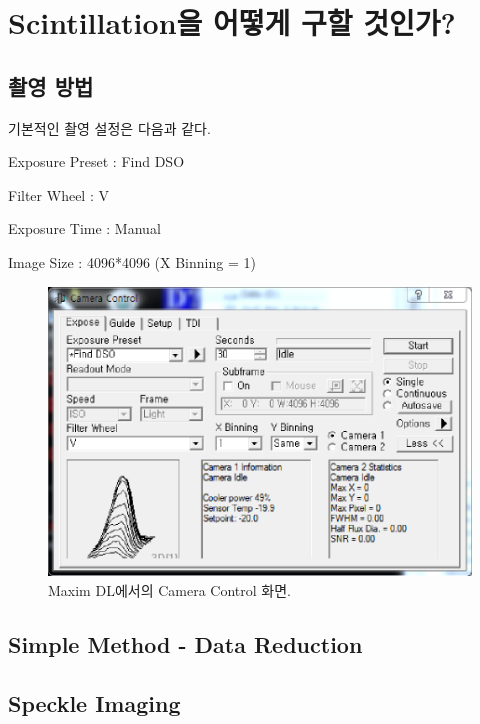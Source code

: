 \documentclass[11pt]{article}
\begin{document}
	\section{Scintillation을 어떻게 구할 것인가?}
	
	\subsection{촬영 방법}
	기본적인 촬영 설정은 다음과 같다.
	\begin{flushleft}
		Exposure Preset : Find DSO 
		
		Filter Wheel : V
		
		Exposure Time : Manual
		
		Image Size : 4096*4096 (X Binning = 1)
		
		\begin{figure}[h]
			\begin{center}
				\includegraphics[scale=0.3]{camera_control_example.png}
				\caption{Maxim DL에서의 Camera Control 화면.}
				\label{camera_control}
			\end{center}
		\end{figure}
		
	\end{flushleft}
	
	\subsection{Simple Method - Data Reduction}
	
	\subsection{Speckle Imaging}
	
\end{document}
